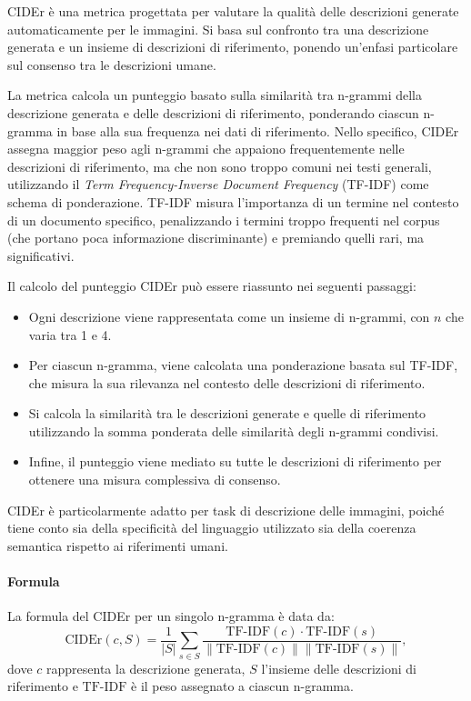 \documentclass[../main.tex]{subfiles}
\begin{document}
CIDEr \cite{vedantam2015ciderconsensusbasedimagedescription} è una metrica progettata per valutare la qualità delle descrizioni generate automaticamente per le immagini. Si basa sul confronto tra una descrizione generata e un insieme di descrizioni di riferimento, ponendo un'enfasi particolare sul consenso tra le descrizioni umane.

La metrica calcola un punteggio basato sulla similarità tra n-grammi della descrizione generata e delle descrizioni di riferimento, ponderando ciascun n-gramma in base alla sua frequenza nei dati di riferimento. Nello specifico, CIDEr assegna maggior peso agli n-grammi che appaiono frequentemente nelle descrizioni di riferimento, ma che non sono troppo comuni nei testi generali, utilizzando il \textit{Term Frequency-Inverse Document Frequency} (TF-IDF) come schema di ponderazione. TF-IDF misura l'importanza di un termine nel contesto di un documento specifico, penalizzando i termini troppo frequenti nel corpus (che portano poca informazione discriminante) e premiando quelli rari, ma significativi.

Il calcolo del punteggio CIDEr può essere riassunto nei seguenti passaggi:
\begin{itemize}
    \item Ogni descrizione viene rappresentata come un insieme di n-grammi, con $n$ che varia tra 1 e 4.
    \item Per ciascun n-gramma, viene calcolata una ponderazione basata sul TF-IDF, che misura la sua rilevanza nel contesto delle descrizioni di riferimento.
    \item Si calcola la similarità tra le descrizioni generate e quelle di riferimento utilizzando la somma ponderata delle similarità degli n-grammi condivisi.
    \item Infine, il punteggio viene mediato su tutte le descrizioni di riferimento per ottenere una misura complessiva di consenso.
\end{itemize}

CIDEr è particolarmente adatto per task di descrizione delle immagini, poiché tiene conto sia della specificità del linguaggio utilizzato sia della coerenza semantica rispetto ai riferimenti umani. 

\paragraph{Formula}

La formula del CIDEr per un singolo n-gramma è data da:
\[
\text{CIDEr}(c, S) = \frac{1}{|S|} \sum_{s \in S} \frac{\text{TF-IDF}(c) \cdot \text{TF-IDF}(s)}{\|\text{TF-IDF}(c)\| \|\text{TF-IDF}(s)\|},
\]
dove $c$ rappresenta la descrizione generata, $S$ l'insieme delle descrizioni di riferimento e $\text{TF-IDF}$ è il peso assegnato a ciascun n-gramma.
\end{document}
